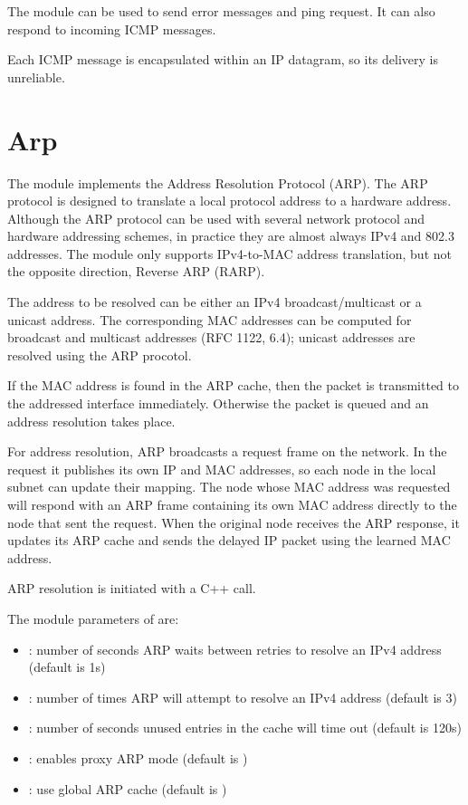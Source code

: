 The  module can be used to send error messages and ping
request. It can also respond to incoming ICMP messages.

Each ICMP message is encapsulated within an IP datagram, so its delivery
is unreliable.

\section{Arp}
\label{sec:ipv4:arp}

The  module implements the Address Resolution Protocol (ARP).
The ARP protocol is designed to translate a local protocol address to a hardware
address. Although the ARP protocol can be used with several network protocol and
hardware addressing schemes, in practice they are almost always IPv4 and 802.3
addresses. The  module only supports IPv4-to-MAC address
translation, but not the opposite direction, Reverse ARP (RARP).

The address to be resolved can be either an IPv4 broadcast/multicast or a
unicast address. The corresponding MAC addresses can be computed for broadcast
and multicast addresses (RFC 1122, 6.4); unicast addresses are resolved
using the ARP procotol.

If the MAC address is found in the ARP cache, then the packet is transmitted to
the addressed interface immediately. Otherwise the packet is queued and an
address resolution takes place.

For address resolution, ARP broadcasts a request frame on the network. In the
request it publishes its own IP and MAC addresses, so each node in the local
subnet can update their mapping. The node whose MAC address was requested will
respond with an ARP frame containing its own MAC address directly to the node
that sent the request. When the original node receives the ARP response, it
updates its ARP cache and sends the delayed IP packet using the learned MAC
address.

ARP resolution is initiated with a C++ call.

The module parameters of  are:

\begin{itemize}
  \item {}: number of seconds ARP waits between retries to resolve an IPv4 address (default is 1s)
  \item {}: number of times ARP will attempt to resolve an IPv4 address (default is 3)
  \item {}: number of seconds unused entries in the cache will time out (default is 120s)
  \item {}: enables proxy ARP mode (default is )
  \item {}: use global ARP cache (default is )
\end{itemize}


